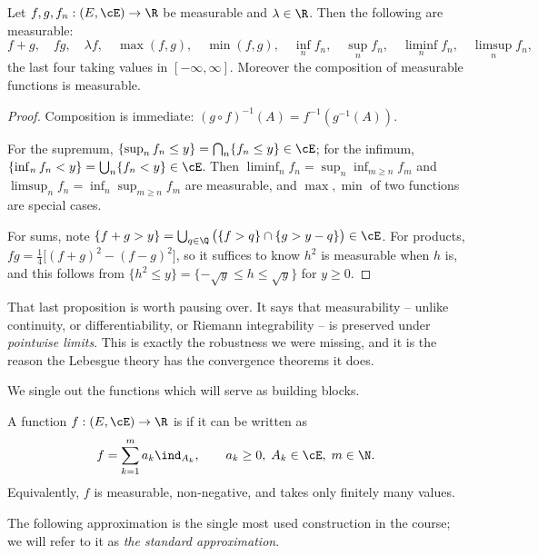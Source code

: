 \begin{proposition}\label{prop:meas-stable}
	Let $f, g, f_n : (E,\cE) \to \R$ be measurable and $\lambda \in \R$. Then the following are measurable:
	$$
	f + g, \quad fg, \quad \lambda f, \quad \max(f,g), \quad \min(f,g), \quad \inf_n f_n, \quad \sup_n f_n, \quad \liminf_n f_n, \quad \limsup_n f_n,\!\!
	$$
	the last four taking values in $[-\infty,\infty]$. Moreover the composition of measurable functions is measurable.
\end{proposition}
\begin{proof}
	Composition is immediate: $(g \circ f)^{-1}(A) = f^{-1}(g^{-1}(A))$.

	For the supremum, $\{\sup_n f_n \leq y\} = \bigcap_n \{f_n \leq y\} \in \cE$; for the infimum, $\{\inf_n f_n < y\} = \bigcup_n \{f_n < y\} \in \cE$. Then $\liminf_n f_n = \sup_n \inf_{m \geq n} f_m$ and $\limsup_n f_n = \inf_n \sup_{m \geq n} f_m$ are measurable, and $\max, \min$ of two functions are special cases.

	For sums, note $\{f + g > y\} = \bigcup_{q \in \Q} \big( \{f > q\} \cap \{g > y - q\}\big) \in \cE$. For products, $fg = \frac{1}{4}\big[(f+g)^2 - (f-g)^2\big]$, so it suffices to know $h^2$ is measurable when $h$ is, and this follows from $\{h^2 \leq y\} = \{-\sqrt y \leq h \leq \sqrt y\}$ for $y \geq 0$.
\end{proof}

That last proposition is worth pausing over. It says that measurability -- unlike continuity, or differentiability, or Riemann integrability -- is preserved under \emph{pointwise limits}. This is exactly the robustness we were missing, and it is the reason the Lebesgue theory has the convergence theorems it does.

We single out the functions which will serve as building blocks.

\begin{definition}
	A function $f : (E,\cE) \to \R$ is  if it can be written as
	$$
	f = \sum_{k=1}^m a_k \ind_{A_k}, \qquad a_k \geq 0, \; A_k \in \cE, \; m \in \N.
	$$
	Equivalently, $f$ is measurable, non-negative, and takes only finitely many values.
\end{definition}

The following approximation is the single most used construction in the course; we will refer to it as \emph{the standard approximation}.

